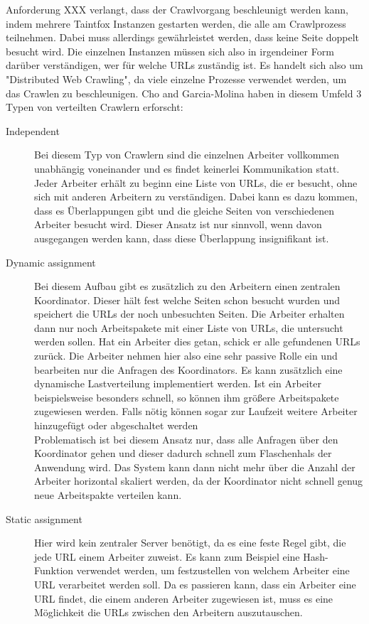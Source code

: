 Anforderung XXX verlangt, dass der Crawlvorgang beschleunigt werden kann, indem mehrere Taintfox Instanzen gestarten werden, die alle am Crawlprozess teilnehmen. Dabei muss allerdings gewährleistet werden, dass keine Seite doppelt besucht wird. Die einzelnen Instanzen müssen sich also in irgendeiner Form darüber verständigen, wer für welche URLs zuständig ist. 
Es handelt sich also um "Distributed Web Crawling", da viele einzelne Prozesse verwendet werden, um das Crawlen zu beschleunigen. 
Cho and Garcia-Molina haben in diesem Umfeld 3 Typen von verteilten Crawlern erforscht: %
\begin{description}
	\item[Independent] 
	Bei diesem Typ von Crawlern sind die einzelnen Arbeiter vollkommen unabhängig voneinander und es findet keinerlei Kommunikation statt. Jeder Arbeiter erhält zu beginn eine Liste von URLs, die er besucht, ohne sich mit anderen Arbeitern zu verständigen. Dabei kann es dazu kommen, dass es Überlappungen gibt und die gleiche Seiten von verschiedenen Arbeiter besucht wird. Dieser Ansatz ist nur sinnvoll, wenn davon ausgegangen werden kann, dass diese Überlappung insignifikant ist.
	\item[Dynamic assignment]
	Bei diesem Aufbau gibt es zusätzlich zu den Arbeitern einen zentralen Koordinator. Dieser hält fest welche Seiten schon besucht wurden und speichert die URLs der noch unbesuchten Seiten. Die Arbeiter erhalten dann nur noch Arbeitspakete mit einer Liste von URLs, die untersucht werden sollen. Hat ein Arbeiter dies getan, schick er alle gefundenen URLs zurück. Die Arbeiter nehmen hier also eine sehr passive Rolle ein und bearbeiten nur die Anfragen des Koordinators. Es kann zusätzlich eine dynamische Lastverteilung implementiert werden. Ist ein Arbeiter beispielsweise besonders schnell, so können ihm größere Arbeitspakete zugewiesen werden. Falls nötig können sogar zur Laufzeit weitere Arbeiter hinzugefügt oder abgeschaltet werden\\
	Problematisch ist bei diesem Ansatz nur, dass alle Anfragen über den Koordinator gehen und dieser dadurch schnell zum Flaschenhals der Anwendung wird. Das System kann dann nicht mehr über die Anzahl der Arbeiter horizontal skaliert werden, da der Koordinator nicht schnell genug neue Arbeitspakte verteilen kann.
	\item[Static assignment] 
	Hier wird kein zentraler Server benötigt, da es eine feste Regel gibt, die jede URL einem Arbeiter zuweist. Es kann zum Beispiel eine Hash-Funktion verwendet werden, um festzustellen von welchem Arbeiter eine URL verarbeitet werden soll. Da es passieren kann, dass ein Arbeiter eine URL findet, die einem anderen Arbeiter zugewiesen ist, muss es eine Möglichkeit die URLs zwischen den Arbeitern auszutauschen.
\end{description}

